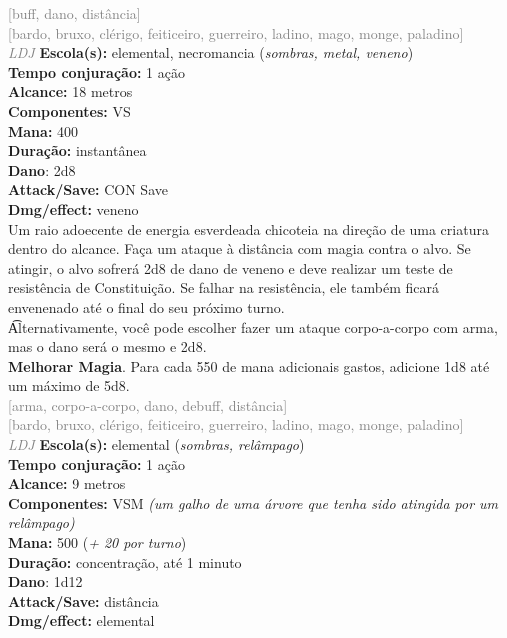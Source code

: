 \documentclass{RPG_Adventure}[2021/10/20]
\begin{document}
{\scriptsize \textcolor{gray}{[buff, dano, distância]\\}}
{\scriptsize \textcolor{gray}{[bardo, bruxo, clérigo, feiticeiro, guerreiro, ladino, mago, monge, paladino]\\}}
{\tiny \textcolor{gray}{\textit{LDJ}}}
{\small \t \textbf{Escola(s):} elemental, necromancia (\textit{sombras, metal, veneno})\\\t \textbf{Tempo conjuração:} 1 ação\\\t \textbf{Alcance:} 18 metros\\\t \textbf{Componentes:} VS\\\t \textbf{Mana:} 400\\\t \textbf{Duração:} instantânea\\\t \textbf{Dano}: 2d8\\\t \textbf{Attack/Save:} CON Save\\\t \textbf{Dmg/effect:} veneno\\}
{\normalsize Um raio adoecente de energia esverdeada chicoteia na direção de uma criatura dentro do alcance. Faça um ataque à distância com magia contra o alvo. Se atingir, o alvo sofrerá 2d8 de dano de veneno e deve realizar um teste de resistência de Constituição. Se falhar na resistência, ele também ficará envenenado até o final do seu próximo turno.\\\t Alternativamente, você pode escolher fazer um ataque corpo-a-corpo com arma, mas o dano será o mesmo e 2d8.\\\t \textbf{Melhorar Magia}. Para cada 550 de mana adicionais gastos, adicione 1d8 até um máximo de 5d8.\\}
{\scriptsize \textcolor{gray}{[arma, corpo-a-corpo, dano, debuff, distância]\\}}
{\scriptsize \textcolor{gray}{[bardo, bruxo, clérigo, feiticeiro, guerreiro, ladino, mago, monge, paladino]\\}}
{\tiny \textcolor{gray}{\textit{LDJ}}}
{\small \t \textbf{Escola(s):} elemental (\textit{sombras, relâmpago})\\\t \textbf{Tempo conjuração:} 1 ação\\\t \textbf{Alcance:} 9 metros\\\t \textbf{Componentes:} VSM \textit{(um galho de uma árvore que tenha sido atingida por um relâmpago)}\\\t \textbf{Mana:} 500 (\textit{+ 20 por turno})\\\t \textbf{Duração:} concentração, até 1 minuto\\\t \textbf{Dano}: 1d12\\\t \textbf{Attack/Save:} distância\\\t \textbf{Dmg/effect:} elemental\\}
\end{document}
